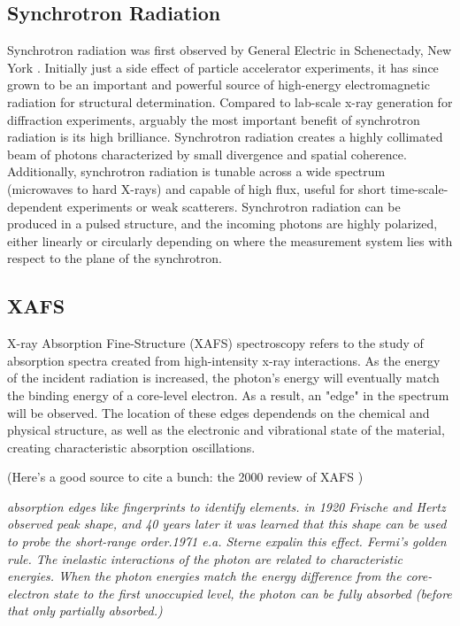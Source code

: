 \subsection{Synchrotron Radiation}

Synchrotron radiation was first observed by General Electric in Schenectady, New York \cite{firstSynchrotronRadPaper}. Initially just a side effect of particle accelerator experiments, it has since grown to be an important and powerful source of high-energy electromagnetic radiation for structural determination. Compared to lab-scale x-ray generation for diffraction experiments, arguably the most important benefit of synchrotron radiation is its high brilliance. Synchrotron radiation creates a highly collimated beam of photons characterized by small divergence and spatial coherence. Additionally, synchrotron radiation is tunable across a wide spectrum (microwaves to hard X-rays) and capable of high flux, useful for short time-scale-dependent experiments or weak scatterers. Synchrotron radiation can be produced in a pulsed structure, and the incoming photons are highly polarized, either linearly or circularly depending on where the measurement system lies with respect to the plane of the synchrotron. 

\subsection{XAFS}
X-ray Absorption Fine-Structure (XAFS) spectroscopy refers to the study of absorption spectra created from high-intensity x-ray interactions. As the energy of the incident radiation is increased, the photon's energy will eventually match the binding energy of a core-level electron. As a result, an "edge" in the spectrum will be observed. The location of these edges dependends on the chemical and physical structure, as well as the electronic and vibrational state of the material, creating characteristic absorption oscillations.

(Here's a good source to cite a bunch: the 2000 review of XAFS
\cite{rehrXAFS2000review})
\cite{newville2014fundamentals}

\textit{absorption edges like fingerprints to identify elements. in 1920 Frische and Hertz observed peak shape, and 40 years later it was learned that this shape can be used to probe the short-range order.1971 e.a. Sterne expalin this effect. Fermi's golden rule. The inelastic interactions of the photon are related to characteristic energies. When the photon energies match the energy difference from the core-electron state to the first unoccupied level, the photon can be fully absorbed (before that only partially absorbed.)}


